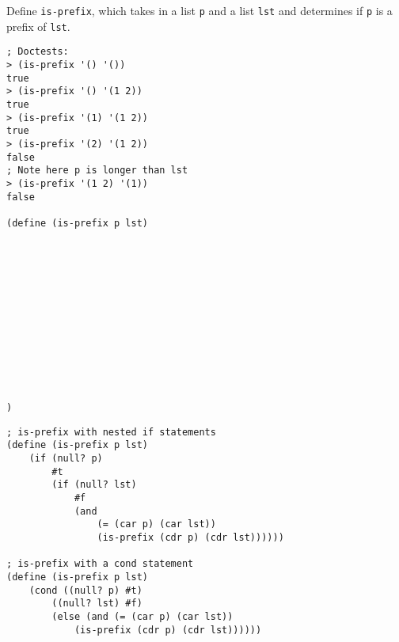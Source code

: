 \begin{blocksection}
\question Define \lstinline$is-prefix$, which takes in a list \lstinline$p$ and a list \lstinline$lst$ and determines if \lstinline$p$ is a prefix of \lstinline$lst$.

\begin{lstlisting}
; Doctests:
> (is-prefix '() '())
true
> (is-prefix '() '(1 2))
true
> (is-prefix '(1) '(1 2))
true
> (is-prefix '(2) '(1 2))
false
; Note here p is longer than lst
> (is-prefix '(1 2) '(1))
false

(define (is-prefix p lst)













)
\end{lstlisting}

\begin{solution}[1.5in]
\begin{lstlisting}
; is-prefix with nested if statements
(define (is-prefix p lst)
    (if (null? p)
        #t
        (if (null? lst)
            #f
            (and
                (= (car p) (car lst))
                (is-prefix (cdr p) (cdr lst))))))

; is-prefix with a cond statement
(define (is-prefix p lst)
    (cond ((null? p) #t)
        ((null? lst) #f)
        (else (and (= (car p) (car lst))
            (is-prefix (cdr p) (cdr lst))))))
 
\end{lstlisting}
\end{solution}
\end{blocksection}
